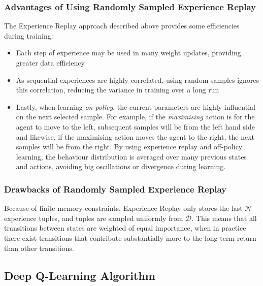 \documentclass{article}
\begin{document}
\subsubsection{Advantages of Using Randomly Sampled Experience Replay}

The Experience Replay approach described above provides some efficiencies during training\cite{mnih2013atari}: 

\begin{itemize}
    \item Each step of experience may be used in many weight updates, providing greater data efficiency
    
    \item As sequential experiences are highly correlated, using random samples ignores this correlation, reducing the variance in training over a long run
    
    \item Lastly, when learning \textit{on-policy}, the current parameters are highly influential on the next selected sample. For example, if the \textit{maximising} action is for the agent to move to the left, subsequent samples will be from the left hand side and likewise, if the maximising action moves the agent to the right, the next samples will be from the right. By using experience replay and off-policy learning, the behaviour distribution is averaged over many previous states and actions, avoiding big oscillations or divergence during learning\cite{mnih2013atari}. 
\end{itemize}

\newpage

\subsubsection{Drawbacks of Randomly Sampled Experience Replay}

Because of finite memory constraints, Experience Replay only stores the last $\mathcal{N}$ experience tuples, and tuples are sampled uniformly from $\mathcal{D}$. This means that all transitions between states are weighted of equal importance, when in practice there exist transitions that contribute substantially more to the long term return than other transitions\cite{mnih2013atari}.

\subsection{Deep Q-Learning Algorithm}
\end{document}
